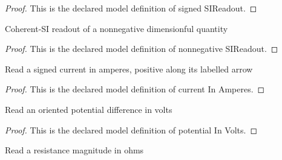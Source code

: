 \begin{proof}
  This is the declared model definition of signed SIReadout.
\end{proof}
\begin{definition}
  \label{def:physics:phyx-mini-0984:phyxminiproblems-problemphyxmini0984-nonnegativesireadout}
  Coherent-SI readout of a nonnegative dimensionful quantity
\end{definition}
\begin{proof}
  This is the declared model definition of nonnegative SIReadout.
\end{proof}
\begin{definition}
  \label{def:physics:phyx-mini-0984:phyxminiproblems-problemphyxmini0984-currentinamperes}
  Read a signed current in amperes, positive along its labelled arrow
\end{definition}
\begin{proof}
  This is the declared model definition of current In Amperes.
\end{proof}
\begin{definition}
  \label{def:physics:phyx-mini-0984:phyxminiproblems-problemphyxmini0984-potentialinvolts}
  Read an oriented potential difference in volts
\end{definition}
\begin{proof}
  This is the declared model definition of potential In Volts.
\end{proof}
\begin{definition}
  \label{def:physics:phyx-mini-0984:phyxminiproblems-problemphyxmini0984-resistanceinohms}
  Read a resistance magnitude in ohms
\end{definition}
